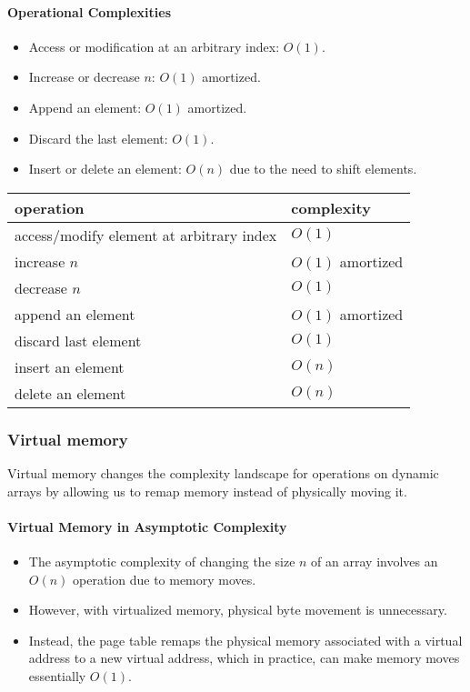 \documentclass[12pt]{article}
\begin{document}
\paragraph{Operational Complexities}
\begin{itemize}
    \item Access or modification at an arbitrary index: \( O(1) \).
    \item Increase or decrease \( n \): \( O(1) \) amortized.
    \item Append an element: \( O(1) \) amortized.
    \item Discard the last element: \( O(1) \).
    \item Insert or delete an element: \( O(n) \) due to the need to shift elements.
\end{itemize}

\begin{center}
\begin{tabular}{ll}
\hline
\textbf{operation} & \textbf{complexity} \\
\hline
access/modify element at arbitrary index & $O(1)$ \\
increase $n$ & $O(1)$ amortized \\
decrease $n$ & $O(1)$ \\
append an element & $O(1)$ amortized \\
discard last element & $O(1)$ \\
insert an element & $O(n)$ \\
delete an element & $O(n)$ \\
\hline
\end{tabular}
\end{center}

\subsubsection{Virtual memory}
Virtual memory changes the complexity landscape for operations on dynamic arrays by allowing us to remap memory instead of physically moving it.

\paragraph{Virtual Memory in Asymptotic Complexity}
\begin{itemize}
    \item The asymptotic complexity of changing the size \( n \) of an array involves an \( O(n) \) operation due to memory moves.
    \item However, with virtualized memory, physical byte movement is unnecessary.
    \item Instead, the page table remaps the physical memory associated with a virtual address to a new virtual address, which in practice, can make memory moves essentially \( O(1) \).
\end{itemize}
\end{document}
